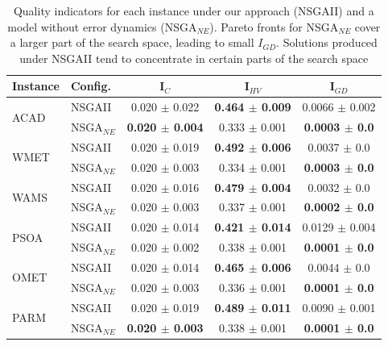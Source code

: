 \documentclass[conference]{IEEEtran}
\begin{document}
\begin{table}[htbp]
	\scriptsize
  \centering
  \caption{Quality indicators for each instance under our approach (NSGAII) and a model without error dynamics (NSGA$_{NE}$). Pareto fronts for NSGA$_{NE}$ cover a larger part of the search space, leading to small $I_{GD}$. Solutions produced under NSGAII tend to concentrate in certain parts of the search space}
    \begin{tabular}{p{0.8cm}p{1.0cm}ccc}
    \toprule
    \textbf{Instance} & \textbf{Config.} & \textbf{I$_{C}$} & \textbf{I$_{HV}$} & \textbf{I$_{GD}$} \\
    \midrule
    \multirow{2}[2]{*}{ACAD} & NSGAII & 0.020 $\pm$ 0.022 & \textbf{0.464 $\pm$ 0.009} & 0.0066 $\pm$ 0.002 \\
          & NSGA$_{NE}$ & \textbf{0.020 $\pm$ 0.004} & 0.333 $\pm$ 0.001 & \textbf{0.0003 $\pm$ 0.0} \\\hline
    \multirow{2}[2]{*}{WMET} & NSGAII & 0.020 $\pm$ 0.019 & \textbf{0.492 $\pm$ 0.006} & 0.0037 $\pm$ 0.0 \\
          & NSGA$_{NE}$ & 0.020 $\pm$ 0.003 & 0.334 $\pm$ 0.001 & \textbf{0.0003 $\pm$ 0.0} \\\hline
    \multirow{2}[2]{*}{WAMS} & NSGAII & 0.020 $\pm$ 0.016 & \textbf{0.479 $\pm$ 0.004} & 0.0032 $\pm$ 0.0 \\
          & NSGA$_{NE}$ & 0.020 $\pm$ 0.003 & 0.337 $\pm$ 0.001 & \textbf{0.0002 $\pm$ 0.0} \\\hline
    \multirow{2}[2]{*}{PSOA} & NSGAII & 0.020 $\pm$ 0.014 & \textbf{0.421 $\pm$ 0.014} & 0.0129 $\pm$ 0.004 \\
          & NSGA$_{NE}$ & 0.020 $\pm$ 0.002 & 0.338 $\pm$ 0.001 & \textbf{0.0001 $\pm$ 0.0} \\\hline
    \multirow{2}[2]{*}{OMET} & NSGAII & 0.020 $\pm$ 0.014 & \textbf{0.465 $\pm$ 0.006} & 0.0044 $\pm$ 0.0 \\
          & NSGA$_{NE}$ & 0.020 $\pm$ 0.003 & 0.336 $\pm$ 0.001 & \textbf{0.0001 $\pm$ 0.0} \\\hline
    \multirow{2}[2]{*}{PARM} & NSGAII & 0.020 $\pm$ 0.019 & \textbf{0.489 $\pm$ 0.011} & 0.0090 $\pm$ 0.001 \\
          & NSGA$_{NE}$ & \textbf{0.020 $\pm$ 0.003} & 0.338 $\pm$ 0.001 & \textbf{0.0001 $\pm$ 0.0} \\
    \bottomrule
    \end{tabular}%
\end{table}%
\end{document}
